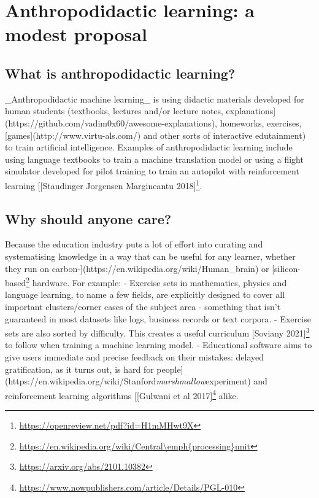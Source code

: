 \section{Anthropodidactic learning: a modest proposal}

\subsection{What is anthropodidactic learning?}

_Anthropodidactic machine learning_ is using didactic materials developed for human students (textbooks, lectures and/or lecture notes, explanations](https://github.com/vadim0x60/awesome-explanations), homeworks, exercises, [games](http://www.virtu-als.com/) and other sorts of interactive edutainment) to train artificial intelligence. Examples of anthropodidactic learning include using language textbooks to train a machine translation model or using a flight simulator developed for pilot training to train an autopilot with reinforcement learning [[Staudinger Jorgensen Margineantu 2018]\footnote{\url{https://openreview.net/pdf?id=H1mMHwt9X}}.

\subsection{Why should anyone care?}

Because the education industry puts a lot of effort into curating and systematising knowledge in a way that can be useful for any learner, whether they run on carbon-](https://en.wikipedia.org/wiki/Human_brain) or [silicon-based\footnote{\url{https://en.wikipedia.org/wiki/Central\emph{processing}unit}} hardware. For example: 
- Exercise sets in mathematics, physics and language learning, to name a few fields, are explicitly designed to cover all important clusters/corner cases of the subject area - something that isn't guaranteed in most datasets like logs, business records or text corpora.
- Exercise sets are also sorted by difficulty. This creates a useful curriculum [Soviany 2021]\footnote{\url{https://arxiv.org/abs/2101.10382}} to follow when training a machine learning model. 
- Educational software aims to give users immediate and precise feedback on their mistakes: delayed gratification, as it turns out, is hard for people](https://en.wikipedia.org/wiki/Stanford\emph{marshmallow}experiment) and reinforcement learning algorithms [[Gulwani et al 2017]\footnote{\url{https://www.nowpublishers.com/article/Details/PGL-010}} alike.

